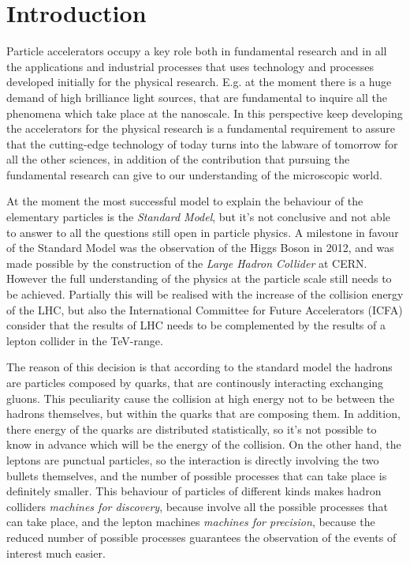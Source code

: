 \chapter{Introduction}
Particle accelerators occupy a key role both in fundamental research and in all the applications and industrial processes that uses technology and processes developed initially for the physical research. E.g. at the moment there is a huge demand of high brilliance light sources, that are fundamental to inquire all the phenomena which take place at the nanoscale. In this perspective keep developing the accelerators for the physical research is a fundamental requirement to assure that the cutting-edge technology of today turns into the labware of tomorrow for all the other sciences, in addition of the contribution that pursuing the fundamental research can give to our understanding of the microscopic world.

At the moment the most successful model to explain the behaviour of the elementary particles is the \textit{Standard Model}, but it's not conclusive and not able to answer to all the questions still open in particle physics. A milestone in favour of the Standard Model was the observation of the Higgs Boson in 2012, and was made possible by the construction of the \textit{Large Hadron Collider} at CERN\cite{CMS:higgs,ATLAS:higgs,LHC:design}. However the full understanding of the physics at the particle scale still needs to be achieved. Partially this will be realised with the increase of the collision energy of the LHC, but also the International Committee for Future Accelerators (ICFA) consider that the results of LHC needs to be complemented by the results of a lepton collider in the TeV-range\cite{ICFA:linStat}.

The reason of this decision is that according to the standard model the hadrons are particles composed by quarks, that are continously interacting exchanging gluons. This peculiarity cause the collision at high energy not to be between the hadrons themselves, but within the quarks that are composing them. In addition, there energy of the quarks are distributed statistically, so it's not possible to know in advance which will be the energy of the collision. On the other hand, the leptons are punctual particles, so the interaction is directly involving the two bullets themselves, and the number of possible processes that can take place is definitely smaller. 
This behaviour of particles of different kinds makes hadron colliders \textit{machines for discovery}, because involve all the possible processes that can take place, and the lepton machines \textit{machines for precision}, because the reduced number of possible processes guarantees the observation of the events of interest much easier.


